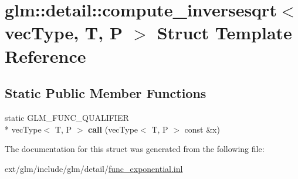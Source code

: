 \hypertarget{structglm_1_1detail_1_1compute__inversesqrt}{\section{glm\-:\-:detail\-:\-:compute\-\_\-inversesqrt$<$ vec\-Type, T, P $>$ Struct Template Reference}
\label{structglm_1_1detail_1_1compute__inversesqrt}
}
\subsection*{Static Public Member Functions}
\begin{DoxyCompactItemize}
\item 
\hypertarget{structglm_1_1detail_1_1compute__inversesqrt_a691942b1bfc04c3563e179ff2fef5375}{static G\-L\-M\-\_\-\-F\-U\-N\-C\-\_\-\-Q\-U\-A\-L\-I\-F\-I\-E\-R \\*
vec\-Type$<$ T, P $>$ {\bfseries call} (vec\-Type$<$ T, P $>$ const \&x)}\label{structglm_1_1detail_1_1compute__inversesqrt_a691942b1bfc04c3563e179ff2fef5375}

\end{DoxyCompactItemize}


The documentation for this struct was generated from the following file\-:\begin{DoxyCompactItemize}
\item 
ext/glm/include/glm/detail/\hyperlink{func__exponential_8inl}{func\-\_\-exponential.\-inl}\end{DoxyCompactItemize}
